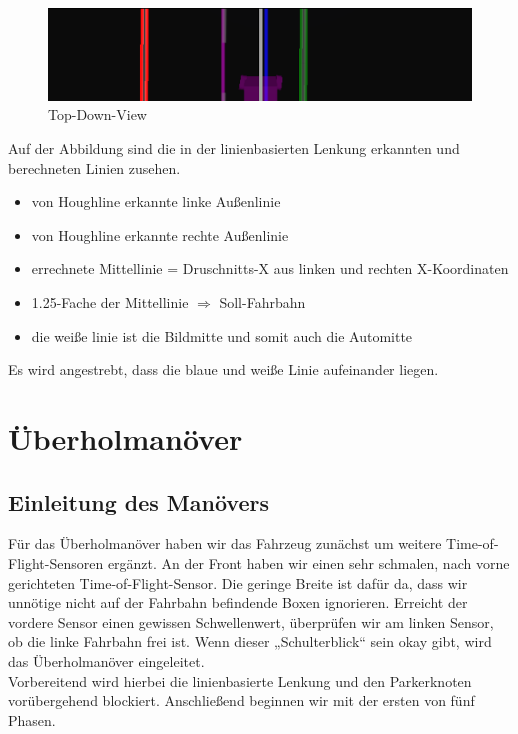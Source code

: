 \begin{figure}[H]
	\centering	
	\includegraphics[width=.8\textwidth]{img/topdown _view}
	\caption[Top-Down-View]{Top-Down-View}
	\label{fig:topdown _view}
\end{figure}

Auf der Abbildung sind die in der linienbasierten Lenkung erkannten und berechneten Linien zusehen.
\begin{itemize}
	\color{red} \item  von Houghline erkannte linke Außenlinie
	\color{green} \item  von Houghline erkannte rechte Außenlinie
	\color{violet} \item  errechnete Mittellinie = Druschnitts-X aus linken und rechten X-Koordinaten
	\color{blue} \item  1.25-Fache der Mittellinie $\Rightarrow$ Soll-Fahrbahn
	\color{gray} \item  die weiße linie ist die Bildmitte und somit auch die Automitte
\end{itemize}
Es wird angestrebt, dass die blaue und weiße Linie aufeinander liegen.

\newpage

\section{Überholmanöver}

\subsection{Einleitung des Manövers}
Für das Überholmanöver haben wir das Fahrzeug zunächst um weitere Time-of-Flight-Sensoren ergänzt. An der Front haben wir einen sehr schmalen, nach vorne gerichteten Time-of-Flight-Sensor. Die geringe Breite ist dafür da, dass wir unnötige nicht auf der Fahrbahn befindende Boxen ignorieren. Erreicht der vordere Sensor einen gewissen Schwellenwert, überprüfen wir am linken Sensor, ob die linke Fahrbahn frei ist. Wenn dieser „Schulterblick“ sein okay gibt, wird das Überholmanöver eingeleitet.
\\
Vorbereitend wird hierbei die linienbasierte Lenkung und den Parkerknoten vorübergehend blockiert. Anschließend beginnen wir mit der ersten von fünf Phasen.

